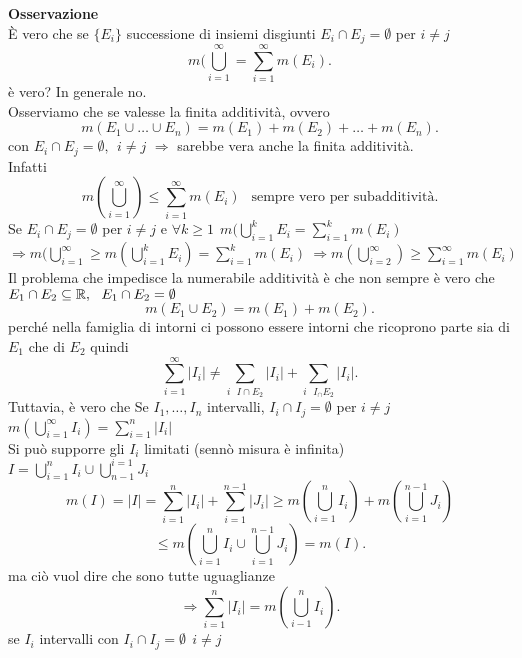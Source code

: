 \documentclass{article}
\begin{document}
	\textbf{Osservazione}\\
	È vero che se $\{E_i\}$ successione di insiemi disgiunti $E_i\cap E_j = \emptyset$ per $i\neq j$\\
	 \[
	m( \bigcup^{\infty}_{i=1} = \sum^{\infty}_{i=1}m(E_i)
	.\]
	è vero? In generale no.\\
	Osserviamo che se valesse la finita additività, ovvero
	\[
	m(E_1\cup\ldots\cup E_n) = m(E_1) + m(E_2) + \ldots + m(E_n)
	.\] 
	con $E_i\cap E_j = \emptyset,\ \  i\neq j$
	 $ \Rightarrow$ sarebbe vera anche la finita additività.\\
	 Infatti\\
	 \[
		 m( \bigcup^{\infty}_{i=1})\leq \sum^{\infty}_{i=1}m(E_i) \ \ \text{ sempre vero per subadditività}
	 .\] 
	 Se $E_i\cap E_j = \emptyset$ per $i\neq j$ e  $\displaystyle\forall k\geq 1 \ \ m( \bigcup^{k}_{i= 1}E_i = \sum^{k}_{i=1}m(E_i)$\\
 $\displaystyle \Rightarrow m( \bigcup^{\infty}_{i=1} \geq m( \bigcup^{k}_{ i=1}E_i) = \sum^{k}_{i=1}m(E_i) \ \Rightarrow m( \bigcup^{\infty}_{i=2}) \geq \sum^{\infty}_{i=1}m(E_i)$\\
 Il problema che impedisce la numerabile additività è che non sempre è vero che $E_1\cap E_2\subseteq\mathbb{R}, \ \ E_1\cap E_2=\emptyset$
 \[
 m(E_1\cup E_2) = m(E_1) + m(E_2)
 .\] 
 perché nella famiglia di intorni ci possono essere intorni che ricoprono parte sia di $E_1$ che di $E_2$ quindi
 \[
 \sum^{\infty}_{i=1}|I_i|\neq \sum^{}_{i
 \ \ \ I\cap E_2}|I_i| + \sum^{}_{i\ \ \  I_\cap E_2}|I_i|
 .\] 
 Tuttavia, è vero che Se $I_1,\ldots, I_n$ intervalli, $I_i\cap I_j = \emptyset $ per $i\neq j$\\
  $m( \bigcup^{\infty}_{i=1}I_i) = \sum^{n}_{i=1}|I_i|$\\
  Si può supporre gli $I_i$ limitati (sennò misura è infinita)\\
  $\displaystyle I = \bigcup^{n}_{i=1}I_i \cup \bigcup^{i=1}_{n-1}J_i$
  \[
  m(I) = |I| = \sum^{n}_{i=1}|I_i| + \sum^{n-1}_{i=1}|J_i| \geq m( \bigcup^{n}_{i=1}I_i) + m( \bigcup^{n-1}_{i=1}J_i)
  \] 
  \[
   \leq m( \bigcup^{n}_{i=1}I_i\cup \bigcup^{n-1}_{i=1}J_i) = m(I)
  .\] 
  ma ciò vuol dire che sono tutte uguaglianze
  \[
   \Rightarrow \sum^{n}_{i=1}|I_i| = m( \bigcup^{n}_{i-1}I_i)
  .\] 
  se $I_i$ intervalli con $I_i\cap I_j = \emptyset \ \ i\neq j$
\end{document}
